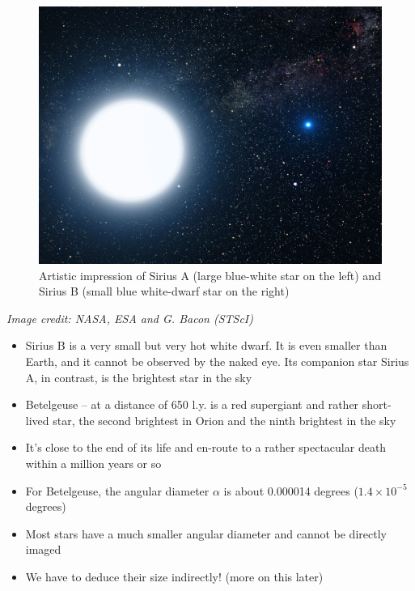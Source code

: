 \documentclass[
  letterpaper,
  DIV=11,
  numbers=noendperiod]{scrreprt}
\providecommand{\tightlist}{%
  \setlength{\itemsep}{0pt}\setlength{\parskip}{0pt}}\usepackage{longtable,booktabs,array}
\begin{document}
\begin{figure}

{\centering \includegraphics{img/siriusAB.jpeg}

}

\caption{Artistic impression of Sirius A (large blue-white star on the
left) and Sirius B (small blue white-dwarf star on the right)}

\end{figure}

\emph{Image credit: NASA, ESA and G. Bacon (STScI)}

\begin{itemize}
\tightlist
\item
  Sirius B is a very small but very hot white dwarf. It is even smaller
  than Earth, and it cannot be observed by the naked eye. Its companion
  star Sirius A, in contrast, is the brightest star in the sky
\item
  Betelgeuse -- at a distance of 650 l.y. is a red supergiant and rather
  short-lived star, the second brightest in Orion and the ninth
  brightest in the sky
\item
  It's close to the end of its life and en-route to a rather spectacular
  death within a million years or so
\item
  For Betelgeuse, the angular diameter \(\alpha\) is about 0.000014
  degrees (\(1.4\times 10^{-5}\) degrees)
\item
  Most stars have a much smaller angular diameter and cannot be directly
  imaged
\item
  We have to deduce their size indirectly! (more on this later)
\end{itemize}
\end{document}
